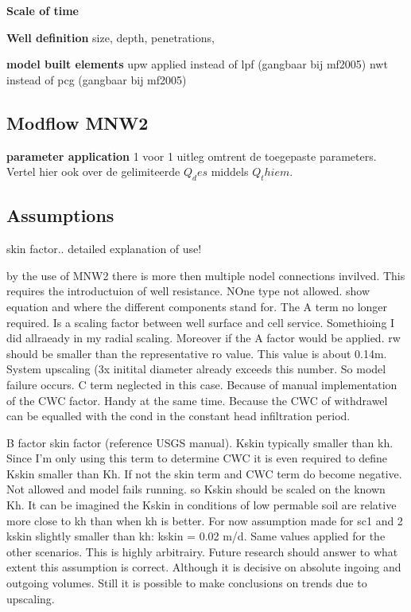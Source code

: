 \textbf{Scale of time}  

\textbf{Well definition}
size, depth, penetrations, 

\textbf{model built elements}
upw applied instead of lpf (gangbaar bij mf2005)
nwt instead of pcg (gangbaar bij mf2005)

\subsection{Modflow MNW2}

\textbf{parameter application} 
1 voor 1 uitleg omtrent de toegepaste parameters. 
Vertel hier ook over de gelimiteerde $Q_des$ middels $Q_thiem$.  

\subsection{Assumptions}

skin factor.. detailed explanation of use!

by the use of MNW2 there is more then multiple nodel connections invilved. This requires the introductuion of well resistance. NOne type not allowed. show equation and where the different components stand for. The A term no longer required. Is a scaling factor between well surface and cell service. Somethioing I did allraeady in my radial scaling. Moreover if the A factor would be applied. rw should be smaller than the representative ro value. This value is about 0.14m. System upscaling (3x initital diameter already exceeds this number. So model failure occurs. C term neglected in this case. Because of manual implementation of the CWC factor. Handy at the same time. Because the CWC of withdrawel can be equalled with the cond in the constant head infiltration period. 

B factor skin factor (reference USGS manual). Kskin typically smaller than kh. Since I'm only using this term to determine CWC it is even required to define Kskin smaller than Kh. If not the skin term and CWC term do become negative. Not allowed and model fails running. so Kskin should be scaled on the known Kh. It can be imagined the Kskin in conditions of low permable soil are relative more close to kh than when kh is better. For now assumption made for sc1 and 2 kskin slightly smaller than kh: kskin = 0.02 m/d. Same values applied for the other scenarios. This is highly arbitrairy. Future research should answer to what extent this assumption is correct. Although it is decisive on absolute ingoing and outgoing volumes. Still it is possible to make conclusions on trends due to upscaling. 

